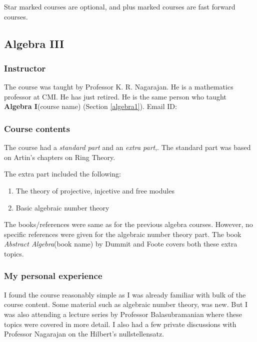 \documentclass[a4paper]{amsart}
\newcommand{\coursename}[1]{{\bf #1}{\small{(course name)}}}
\newcommand{\bookname}[1]{{\em #1}{\small{(book name)}}}
\begin{document}
Star marked courses are optional, and plus marked courses are fast forward courses.

\subsection{Algebra III}\label{algebra3}

\subsubsection{Instructor}

The course was taught by Professor K. R. Nagarajan. He is a mathematics
professor at CMI. He has just retired. He is the same person who taught 
\coursename{Algebra I} (Section \ref{algebra1}).
Email ID: 

\subsubsection{Course contents}

The course had a {\em standard part} and an {\em extra part},. The standard part was based on Artin's chapters
on Ring Theory.

The extra part included the following:

\begin{enumerate}

\item The theory of projective, injcetive and free modules

\item Basic algebraic number theory

\end{enumerate}

The books/references were same as for the previous algebra courses.
However, no specific references were given for the algebraic number
theory part. The book \bookname{Abstract Algebra} by Dummit and Foote
covers both these extra topics.

\subsubsection{My personal experience}

I found the course reasonably simple as I was already familiar with
bulk of the course content.  Some material such as algebraic number
theory, was new. But I was also attending a lecture series by
Professor Balasubramanian where these topics were covered in more
detail. I also had a few private discussions with Professor Nagarajan
on the Hilbert's nullstellensatz.
\end{document}
